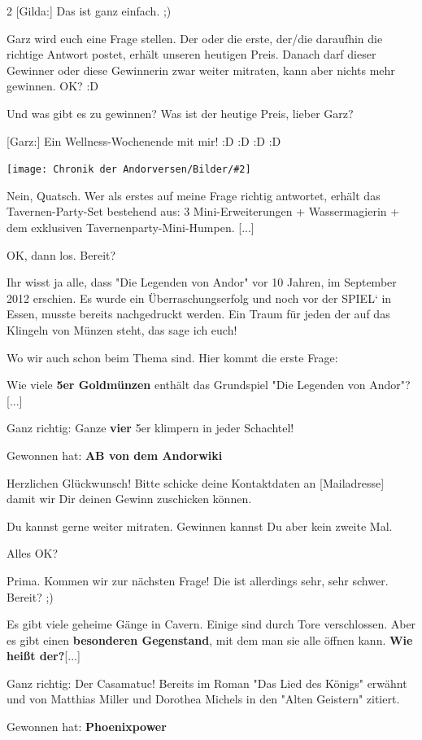 \documentclass[10pt, a4paper, oneside]{book}
\newcommand{\bildmitts}[2][height=0.32\textwidth,width=0.48\textwidth,keepaspectratio]{%
    \begin{center}
        \texttt{[image: Chronik der Andorversen/Bilder/\#2]}
    \end{center}
}
\begin{document}
\begin{multicols}{2}
[Gilda:] Das ist ganz einfach. ;)

Garz wird euch eine Frage stellen. Der oder die erste, der/die daraufhin die richtige Antwort postet, erhält unseren heutigen Preis. Danach darf dieser Gewinner oder diese Gewinnerin zwar weiter mitraten, kann aber nichts mehr gewinnen. OK? :D

Und was gibt es zu gewinnen? Was ist der heutige Preis, lieber Garz?

[Garz:] Ein Wellness-Wochenende mit mir! :D :D :D :D

\bildmitts{AA2022 Tavernen-Party 3.jpeg}

Nein, Quatsch. Wer als erstes auf meine Frage richtig antwortet, erhält das Tavernen-Party-Set bestehend aus: 3 Mini-Erweiterungen + Wassermagierin + dem exklusiven Tavernenparty-Mini-Humpen. [...]

OK, dann los. Bereit?

Ihr wisst ja alle, dass "Die Legenden von Andor" vor 10 Jahren, im September 2012 erschien. Es wurde ein Überraschungserfolg und noch vor der SPIEL‘ in Essen, musste bereits nachgedruckt werden. Ein Traum für jeden der auf das Klingeln von Münzen steht, das sage ich euch!

Wo wir auch schon beim Thema sind. Hier kommt die erste Frage:

Wie viele \textbf{5er Goldmünzen} enthält das Grundspiel "Die Legenden von Andor"? [...] 

Ganz richtig: Ganze \textbf{vier} 5er klimpern in jeder Schachtel!

Gewonnen hat: \textbf{AB von dem Andorwiki}

Herzlichen Glückwunsch! Bitte schicke deine Kontaktdaten an [Mailadresse] damit wir Dir deinen Gewinn zuschicken können.

Du kannst gerne weiter mitraten. Gewinnen kannst Du aber kein zweite Mal.

Alles OK?

Prima. Kommen wir zur nächsten Frage! Die ist allerdings sehr, sehr schwer. Bereit? ;)

Es gibt viele geheime Gänge in Cavern. Einige sind durch Tore verschlossen. Aber es gibt einen \textbf{besonderen Gegenstand}, mit dem man sie alle öffnen kann. \textbf{Wie heißt der?}[...] 

Ganz richtig: Der Casamatuc! Bereits im Roman "Das Lied des Königs" erwähnt und von Matthias Miller und Dorothea Michels in den "Alten Geistern" zitiert.

Gewonnen hat: \textbf{Phoenixpower}


\end{multicols}
\end{document}
